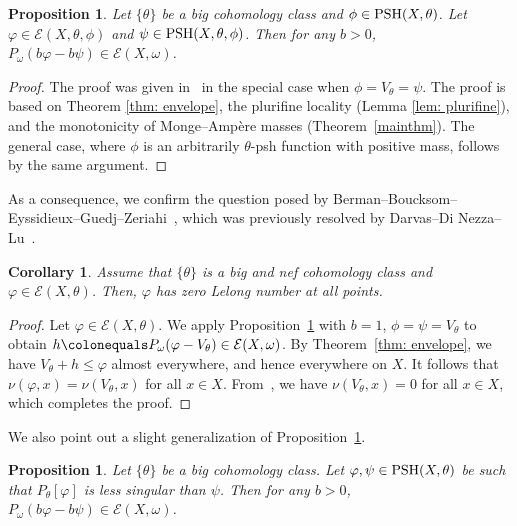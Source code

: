 \documentclass[a4paper]{amsart}
\numberwithin{equation}{section}
\newtheorem{proposition}[theorem]{Proposition}
\newtheorem{corollary}[theorem]{Corollary}
\theoremstyle{definition}
\numberwithin{equation}{section}
\newcommand{\PSH}{{\rm PSH}}
\begin{document}
\begin{proposition}\label{prop: homega}
Let $\{\theta\}$ be a big cohomology class and $\phi\in\PSH(X,\theta)$. Let $\varphi\in\mathcal{E}(X,\theta,\phi)$ and $\psi\in \PSH(X,\theta,\phi)$. Then for any $b>0$, $P_\omega(b\varphi-b\psi)\in\mathcal{E}(X,\omega)$.
\end{proposition}
\begin{proof}
The proof was given in~\cite[Proposition 2.10]{dang2021continuity} in the special case when $\phi=V_\theta=\psi$. The proof is based on Theorem \ref{thm: envelope}, the plurifine locality (Lemma \ref{lem: plurifine}), and the monotonicity of Monge--Amp\`ere masses (Theorem~\ref{mainthm}).
The general case, where $\phi$ is an arbitrarily $\theta$-psh function with positive mass, follows by the same argument.
\end{proof}
As a consequence, we confirm the question posed by Berman--Boucksom--Eyssidieux--Guedj--Zeriahi~\cite[Question 36]{dinew2016open}, which was previously resolved by Darvas--Di Nezza--Lu~\cite{darvas2018singularity}.
\begin{corollary}
Assume that $\{\theta\}$ is a big and nef cohomology class and $\varphi\in\mathcal{E}(X,\theta)$. Then, $\varphi$ has zero Lelong number at all points. 
\end{corollary} 
\begin{proof}
Let $\varphi\in \mathcal{E}(X,\theta)$. 
We apply Proposition~\ref{prop: homega} with $b=1$, $\phi=\psi=V_\theta$ to obtain $h\colonequals P_\omega(\varphi-V_\theta)\in\mathcal{E}(X,\omega)$. By Theorem~\ref{thm: envelope}, we have $V_\theta+h\leq\varphi$ almost everywhere, and hence everywhere on $X$. It follows that $\nu(\varphi,x)=\nu(V_\theta,x)$ for all $x\in X$. From~\cite[Propositions 3.2, 3.6]{boucksom2004divisorial}, we have $\nu(V_\theta,x)=0$ for all $x\in X$, which completes the proof. 
\end{proof}
We also point out a slight generalization of Proposition~\ref{prop: homega}.
\begin{proposition}\label{prop: hOmega}
	\label{prop_imp}
	Let $\{\theta\}$ be a big cohomology class. Let $\varphi,\psi\in\PSH(X,\theta)$ be such that $P_\theta[\varphi]$ is less singular than $\psi$. Then for any $b>0$, $P_\omega(b\varphi-b\psi)\in\mathcal{E}(X,\omega)$.  
\end{proposition}
\end{document}
